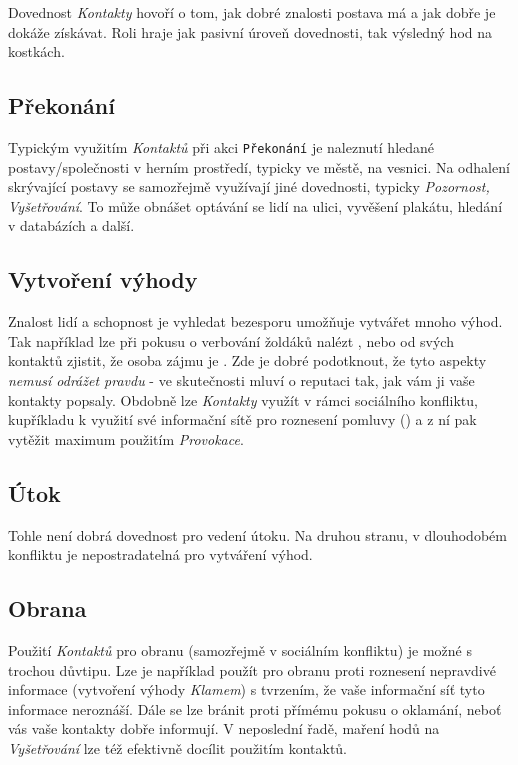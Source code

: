 \documentclass[../main.tex]{subfiles}
\begin{document}
Dovednost \textit{Kontakty} hovoří o tom, jak dobré znalosti postava má a jak dobře je dokáže získávat. Roli hraje jak pasivní úroveň dovednosti, tak výsledný hod na kostkách.

\subsection*{Překonání}
\label{subsec:kontakty-prekonani}
\prekonani

Typickým využitím \textit{Kontaktů} při akci \texttt{Překonání} je naleznutí hledané postavy/společnosti v herním prostředí, typicky ve městě, na vesnici. Na odhalení skrývající postavy se samozřejmě využívají jiné dovednosti, typicky \textit{Pozornost, Vyšetřování}. To může obnášet optávání se lidí na ulici, vyvěšení plakátu, hledání v databázích a další. 

\subsection*{Vytvoření výhody}
\label{subsec:kontakty-vytvoreni}
\vytvoreni

Znalost lidí a schopnost je vyhledat bezesporu umožňuje vytvářet mnoho výhod. Tak například lze při pokusu o verbování žoldáků nalézt , nebo od svých kontaktů zjistit, že osoba zájmu je . Zde je dobré podotknout, že tyto aspekty \textit{nemusí odrážet pravdu} - ve skutečnosti mluví o reputaci tak, jak vám ji vaše kontakty popsaly.
Obdobně lze \textit{Kontakty} využít v rámci sociálního konfliktu, kupříkladu k využití své informační sítě pro roznesení pomluvy () a z ní pak vytěžit maximum použitím \textit{Provokace}.

\subsection*{Útok}
\label{subsec:kontakty-utok}
\utok

Tohle není dobrá dovednost pro vedení útoku. Na druhou stranu, v dlouhodobém konfliktu je nepostradatelná pro vytváření výhod.

\subsection*{Obrana}
\label{subsec:kontakty-obrana}
\obrana

Použití \textit{Kontaktů} pro obranu (samozřejmě v sociálním konfliktu) je možné s trochou důvtipu. Lze je například použít pro obranu proti roznesení nepravdivé informace (vytvoření výhody \textit{Klamem}) s tvrzením, že vaše informační síť tyto informace neroznáší. Dále se lze bránit proti přímému pokusu o oklamání, neboť vás vaše kontakty dobře informují. V neposlední řadě, maření hodů na \textit{Vyšetřování} lze též efektivně docílit použitím kontaktů.
\end{document}
